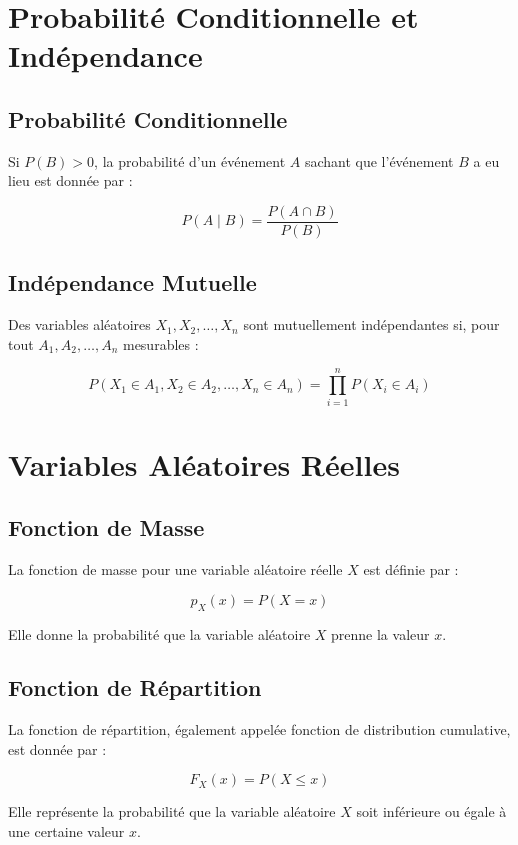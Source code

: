 \documentclass{article}
\begin{document}
\section{Probabilité Conditionnelle et Indépendance}

\subsection{Probabilité Conditionnelle}

Si $P(B) > 0$, la probabilité d'un événement $A$ sachant que l'événement $B$ a eu lieu est donnée par :

\[
P(A \mid B) = \frac{P(A \cap B)}{P(B)}
\]

\subsection{Indépendance Mutuelle}

Des variables aléatoires $X_1, X_2, \dotsc, X_n$ sont mutuellement indépendantes si, pour tout $A_1, A_2, \dotsc, A_n$ mesurables :

\[
P(X_1 \in A_1, X_2 \in A_2, \dotsc, X_n \in A_n) = \prod_{i=1}^n P(X_i \in A_i)
\]

\section{Variables Aléatoires Réelles}

\subsection{Fonction de Masse}

La fonction de masse pour une variable aléatoire réelle $X$ est définie par :

\[
p_X(x) = P(X = x)
\]

Elle donne la probabilité que la variable aléatoire $X$ prenne la valeur $x$.

\subsection{Fonction de Répartition}

La fonction de répartition, également appelée fonction de distribution cumulative, est donnée par :

\[
F_X(x) = P(X \leq x)
\]

Elle représente la probabilité que la variable aléatoire $X$ soit inférieure ou égale à une certaine valeur $x$.
\end{document}
